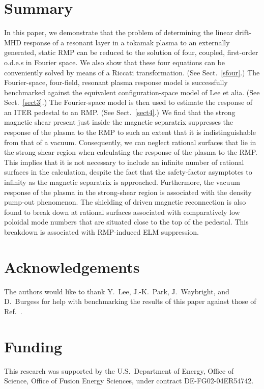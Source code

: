 \documentclass[12pt,prb,aps]{revtex4-1}
\begin{document}
\section{Summary}\label{sect5}
In this paper, we  demonstrate that the problem of determining  the linear drift-MHD response of a resonant layer in a tokamak plasma to an externally generated, static  RMP can  be reduced to
the solution of  four, coupled, first-order o.d.e.s in Fourier space. 
We also show that these 
four equations  can be conveniently solved by means of a Riccati transformation. (See Sect.~\ref{sfour}.) The Fourier-space, four-field, resonant plasma response model is successfully benchmarked against the equivalent configuration-space model of Lee et alia.\cite{lee} (See Sect.~\ref{sect3}.) The Fourier-space model is then used to
estimate the response of an ITER pedestal to an RMP. (See Sect.~\ref{sect4}.) We find that the strong magnetic shear present just inside the magnetic
separatrix  suppresses the response of the plasma to the RMP to such an extent that it is indistinguishable from that
of a vacuum.\cite{rf2025} Consequently, we can neglect rational surfaces that lie in the strong-shear region when calculating the response of the plasma to the RMP. This implies
that it is not necessary to include an infinite number of rational surfaces in the calculation, despite the fact that the safety-factor asymptotes to infinity
as the magnetic separatrix is approached.  Furthermore, the vacuum response of the plasma in the strong-shear region is associated with the density pump-out phenomenon. The shielding of driven magnetic reconnection is also found to break down at rational surfaces associated with comparatively low
poloidal mode numbers that are situated close to the top of the pedestal. This breakdown is associated with RMP-induced ELM suppression.  

\section*{Acknowledgements}
The authors would like to thank   Y.~Lee, J.-K.~Park, J.~Waybright, and D.~Burgess for help with benchmarking the results of this paper against those of
Ref.~. 

\section*{Funding}
This research was supported by the U.S.\ Department of Energy, Office of Science, Office of Fusion Energy Sciences,  under  contract DE-FG02-04ER54742. 
\end{document}
